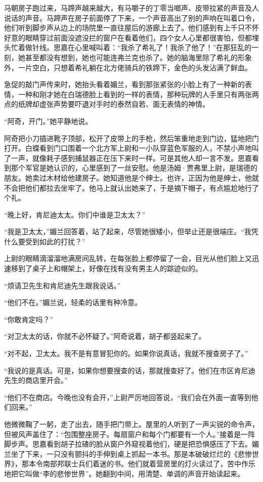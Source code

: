 \par 马朝房子跑过来，马蹄声越来越大，有马嚼子的丁零当啷声、皮带拉紧的声音及人说话的声音。马蹄声在房子前面停了下来，一个声音高出了别的声响在叫着口令，他们听到脚步声从边上的场院里一直往屋后的游廊上去了。他们感到有上千只不怀好意的眼睛穿过前面没遮没拦的窗户在看着他们，四个女人心里都很害怕，但都埋头忙着做针线。思嘉在心里喊叫着：“我杀了希礼了！我杀了他了！”在那狂乱的一刻，她甚至都没有想到，她也可能连弗兰克也杀了。她的脑海里除了希礼的形象外，一片空白，只想着希礼躺在北方佬骑兵的铁蹄下，金色的头发沾满了鲜血。
\par 急促的敲门声传来时，她抬头看着媚兰，看到那张紧张的小脸上有了一种新的表情，一种和刚才她在白瑞德脸上看到的一样的表情，那种玩牌的人手里只有两张两点的纸牌却虚张声势要吓退对手时的泰然自若、面无表情的神情。
\par “阿奇，开门。”她平静地说。
\par 阿奇把小刀插进靴子顶部，松开了皮带上的手枪，然后笨重地走到门边，猛地把门打开。白蝶看到门口围着一个北方军上尉和一小队穿蓝色军服的人，不禁小声地叫了一声，就像耗子感到捕鼠器正在压下来时一样。可是其他人却一言不发。思嘉看到那个军官是她认识的，心里感到了一丝安慰。他是汤姆·贾弗里上尉，是瑞德的朋友。她卖过木材给他建房子。她知道他是个绅士。也许，正因为他是绅士，他就不会把他们都拉去坐牢了。他马上就认出她来了，于是摘下帽子，有点尴尬地行了个礼。
\par “晚上好，肯尼迪太太。你们中谁是卫太太？”
\par “我是卫太太，”媚兰回答着，站了起来，尽管她很矮小，但举止还是很端庄。“我凭什么要受到如此的打扰？”
\par 上尉的眼睛滴溜溜地满房间乱转，在每张脸上都停留了一会，目光从他们脸上又迅速移到了桌子上和帽架上，好像在找有没有男主人的踪迹似的。
\par “烦请卫先生和肯尼迪先生跟我说话。”
\par “他们不在。”媚兰说，轻柔的话里有种冷意。
\par “你敢肯定吗？”
\par “对卫太太的话，你就不必怀疑了。”阿奇说着，胡子都竖起来了。
\par “对不起，卫太太。我不是有意冒犯你的。如果你说真话，我就不搜查房子了。”
\par “我说的是真话。可是，如果你想要搜查的话，那就搜查好了。他们在市区肯尼迪先生的商店里开会。”
\par “他们不在商店。今晚也没有会开，”上尉严厉地回答说，“我们会在外面一直等到他们回来。”
\par 他微微鞠了一躬，走了出去，随手把门带上。屋里的人听到了一声尖锐的命令声，但被风声盖住了：“包围整座房子。每扇窗户和每个门都要有一个人。”接着是一阵脚步声。思嘉看到胡子拉碴的脸从窗户外窥视着他们，硬是把恐惧感压了下去。媚兰坐了下来，一只没有颤抖的手伸到桌上抓起一本书。那是本破破烂烂的《悲惨世界》，那本令南部邦联士兵们着迷的书。他们就着营房里的灯火读过了，苦中作乐地把它叫做“李的悲惨世界”。她翻到中间，用清楚、单调的声音开始读起来。

